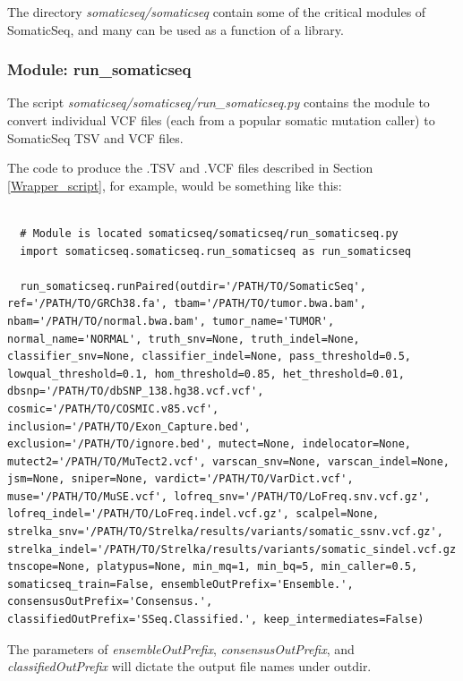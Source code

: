 \documentclass[10pt,letterpaper]{article}
\begin{document}
\begin{sloppypar}
The directory \textit{somaticseq/somaticseq} contain some of the critical modules of SomaticSeq, and many can be used as a function of a library. 


\subsubsection{Module: run\_somaticseq} \label{run_somaticseq}

The script \textit{somaticseq/somaticseq/run\_somaticseq.py} contains the module to convert individual VCF files (each from a popular somatic mutation caller) to SomaticSeq TSV and VCF files. 

The code to produce the .TSV and .VCF files described in Section \ref{Wrapper_script}, for example, would be something like this:

\begin{lstlisting}

  # Module is located somaticseq/somaticseq/run_somaticseq.py
  import somaticseq.somaticseq.run_somaticseq as run_somaticseq
  
  run_somaticseq.runPaired(outdir='/PATH/TO/SomaticSeq', ref='/PATH/TO/GRCh38.fa', tbam='/PATH/TO/tumor.bwa.bam', nbam='/PATH/TO/normal.bwa.bam', tumor_name='TUMOR', normal_name='NORMAL', truth_snv=None, truth_indel=None, classifier_snv=None, classifier_indel=None, pass_threshold=0.5, lowqual_threshold=0.1, hom_threshold=0.85, het_threshold=0.01, dbsnp='/PATH/TO/dbSNP_138.hg38.vcf.vcf', cosmic='/PATH/TO/COSMIC.v85.vcf', inclusion='/PATH/TO/Exon_Capture.bed', exclusion='/PATH/TO/ignore.bed', mutect=None, indelocator=None, mutect2='/PATH/TO/MuTect2.vcf', varscan_snv=None, varscan_indel=None, jsm=None, sniper=None, vardict='/PATH/TO/VarDict.vcf', muse='/PATH/TO/MuSE.vcf', lofreq_snv='/PATH/TO/LoFreq.snv.vcf.gz', lofreq_indel='/PATH/TO/LoFreq.indel.vcf.gz', scalpel=None, strelka_snv='/PATH/TO/Strelka/results/variants/somatic_ssnv.vcf.gz', strelka_indel='/PATH/TO/Strelka/results/variants/somatic_sindel.vcf.gz', tnscope=None, platypus=None, min_mq=1, min_bq=5, min_caller=0.5, somaticseq_train=False, ensembleOutPrefix='Ensemble.', consensusOutPrefix='Consensus.', classifiedOutPrefix='SSeq.Classified.', keep_intermediates=False)

\end{lstlisting}

The parameters of \textit{ensembleOutPrefix}, \textit{consensusOutPrefix}, and \textit{classifiedOutPrefix} will dictate the output file names under outdir.



\end{sloppypar}
\end{document}
